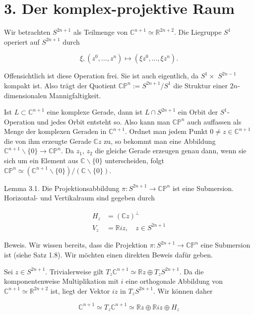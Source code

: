 \documentclass[10pt, letterpaper]{article}
\begin{document}
\section*{3. Der komplex-projektive Raum}
Wir betrachten $S^{2 n+1}$ als Teilmenge von $\mathbb{C}^{n+1} \simeq \mathbb{R}^{2 n+2}$. Die Liegruppe $S^{1}$ operiert auf $S^{2 n+1}$ durch

$$
\xi,\left(z^{0}, \ldots, z^{n}\right) \mapsto\left(\xi z^{0}, \ldots, \xi z^{n}\right) .
$$

Offensichtlich ist diese Operation frei. Sie ist auch eigentlich, da $S^{1} \times$ $S^{2 n-1}$ kompakt ist. Also trägt der Quotient $\mathbb{C} \mathbb{P}^{n}:=S^{2 n+1} / S^{1}$ die Struktur einer $2 n$-dimensionalen Mannigfaltigkeit.

Ist $L \subset \mathbb{C}^{n+1}$ eine komplexe Gerade, dann ist $L \cap S^{2 n+1}$ ein Orbit der $S^{1}$-Operation und jedes Orbit entsteht so. Also kann man $\mathbb{C P}^{n}$ auch auffassen als Menge der komplexen Geraden in $\mathbb{C}^{n+1}$. Ordnet man jedem Punkt $0 \neq z \in \mathbb{C}^{n+1}$ die von ihm erzeugte Gerade $\mathbb{C} z$ zu, so bekommt man eine Abbildung $\mathbb{C}^{n+1} \backslash\{0\} \rightarrow \mathbb{C} \mathbb{P}^{n}$. Da $z_{1}$, $z_{2}$ die gleiche Gerade erzeugen genau dann, wenn sie sich um ein Element aus $\mathbb{C} \backslash\{0\}$ unterscheiden, folgt $\mathbb{C P}^{n} \simeq\left(\mathbb{C}^{n+1} \backslash\{0\}\right) /(\mathbb{C} \backslash\{0\})$.

Lemma 3.1. Die Projektionsabbildung $\pi: S^{2 n+1} \rightarrow \mathbb{C P}^{n}$ ist eine Submersion. Horizontal- und Vertikalraum sind gegeben durch

$$
\begin{aligned}
H_{z} & =(\mathbb{C} z)^{\perp} \\
V_{z} & =\mathbb{R} i z, \quad z \in S^{2 n+1}
\end{aligned}
$$

Beweis. Wir wissen bereits, dass die Projektion $\pi: S^{2 n+1} \rightarrow \mathbb{C} \mathbb{P}^{n}$ eine Submersion ist (siehe Satz 1.8). Wir möchten einen direkten Beweis dafür geben.

Sei $z \in S^{2 n+1}$. Trivialerweise gilt $T_{z} \mathbb{C}^{n+1} \simeq \mathbb{R} z \oplus T_{z} S^{2 n+1}$. Da die komponentenweise Multiplikation mit $i$ eine orthogonale Abbildung von $\mathbb{C}^{n+1} \simeq \mathbb{R}^{2 n+2}$ ist, liegt der Vektor $i z$ in $T_{z} S^{2 n+1}$. Wir können daher

$$
\mathbb{C}^{n+1} \simeq T_{z} \mathbb{C}^{n+1} \simeq \mathbb{R} z \oplus \mathbb{R} i z \oplus H_{z}
$$
\end{document}

